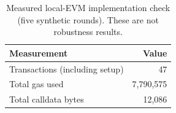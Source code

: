 \begin{table}[t]\centering\caption{Measured local-EVM implementation check (five synthetic rounds). These are not robustness results.}
\begin{tabular}{lr}\toprule Measurement & Value \\ \midrule
Transactions (including setup) & 47 \\
Total gas used & 7,790,575 \\
Total calldata bytes & 12,086 \\
\bottomrule\end{tabular}\label{tab:contract}\end{table}
